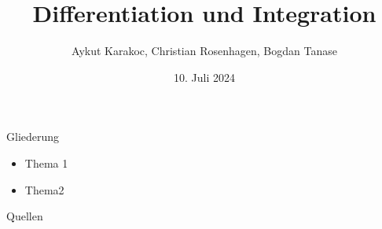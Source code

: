 \documentclass[12pt,accentcolor=TUDa-2c, marginpar=false, authorontitle=true]{tudabeamer}
\title{Differentiation und Integration}
\author{Aykut Karakoc, Christian Rosenhagen, Bogdan Tanase}
\date{10. Juli 2024}
\begin{document}
	\maketitle
	
	\begin{frame}{Gliederung}
		\begin{itemize}[<+->]
			\item Thema 1
			\item Thema2
		\end{itemize}
	\end{frame}

	\begin{frame}{Quellen}
		
	\end{frame}
\end{document}
